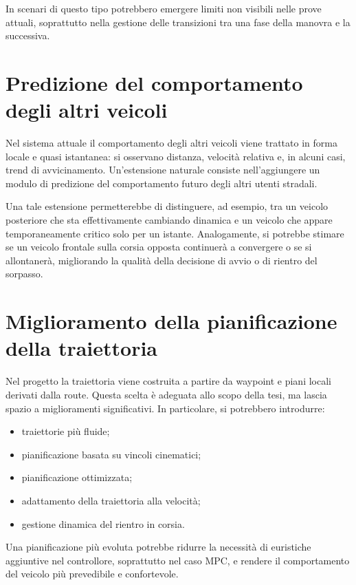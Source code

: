 In scenari di questo tipo potrebbero emergere limiti non visibili nelle prove attuali, soprattutto nella gestione delle transizioni tra una fase della manovra e la successiva.

\section{Predizione del comportamento degli altri veicoli}

Nel sistema attuale il comportamento degli altri veicoli viene trattato in forma locale e quasi istantanea: si osservano distanza, velocità relativa e, in alcuni casi, trend di avvicinamento. Un'estensione naturale consiste nell'aggiungere un modulo di predizione del comportamento futuro degli altri utenti stradali.

Una tale estensione permetterebbe di distinguere, ad esempio, tra un veicolo posteriore che sta effettivamente cambiando dinamica e un veicolo che appare temporaneamente critico solo per un istante. Analogamente, si potrebbe stimare se un veicolo frontale sulla corsia opposta continuerà a convergere o se si allontanerà, migliorando la qualità della decisione di avvio o di rientro del sorpasso.

\section{Miglioramento della pianificazione della traiettoria}

Nel progetto la traiettoria viene costruita a partire da waypoint e piani locali derivati dalla route. Questa scelta è adeguata allo scopo della tesi, ma lascia spazio a miglioramenti significativi. In particolare, si potrebbero introdurre:

\begin{itemize}
    \item traiettorie più fluide;
    \item pianificazione basata su vincoli cinematici;
    \item pianificazione ottimizzata;
    \item adattamento della traiettoria alla velocità;
    \item gestione dinamica del rientro in corsia.
\end{itemize}

Una pianificazione più evoluta potrebbe ridurre la necessità di euristiche aggiuntive nel controllore, soprattutto nel caso MPC, e rendere il comportamento del veicolo più prevedibile e confortevole.

